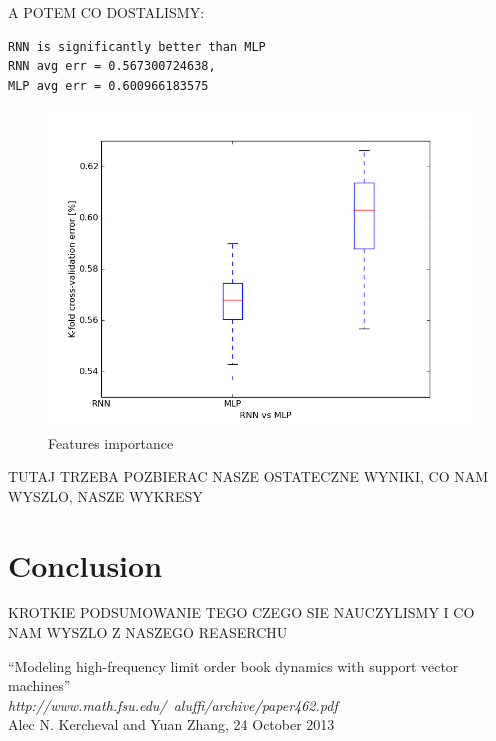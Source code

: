 \documentclass[twoside]{article}
\begin{document}
\begin{multicols}{2}
A POTEM CO DOSTALISMY: \\
\newline
\begin{lstlisting}[caption={RNN vs MLP with 200 epochs and 20 crossvalidation steps output:}]
RNN is significantly better than MLP
RNN avg err = 0.567300724638, 
MLP avg err = 0.600966183575
\end{lstlisting}

\begin{figure}[H]
\centering
\includegraphics[scale=0.4]{../results/rnn_vs_mlp_200iters_20cross}
\caption{Features importance}
\label{ref:rnn}
\end{figure} 

TUTAJ TRZEBA POZBIERAC NASZE OSTATECZNE WYNIKI, CO NAM WYSZLO, NASZE WYKRESY

\section{Conclusion}

KROTKIE PODSUMOWANIE TEGO CZEGO SIE NAUCZYLISMY I CO NAM WYSZLO Z NASZEGO REASERCHU


\begin{thebibliography}{99}

    ``Modeling high-frequency limit order book dynamics with support vector machines'' \\
\emph{http://www.math.fsu.edu/~aluffi/archive/paper462.pdf} \\
	Alec N. Kercheval and Yuan Zhang, 24 October 2013


\end{thebibliography}
\end{multicols}
\end{document}
